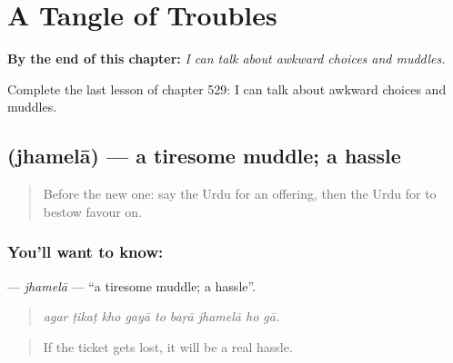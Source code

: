 
\chapter{A Tangle of Troubles}
\label{ch:ur-a-tangle-of-troubles}

\begin{chapteropening}
\textbf{By the end of this chapter:} \emph{I can talk about awkward choices and muddles.}

Complete the last lesson of chapter 529: I can talk about awkward choices and muddles.
\end{chapteropening}

\section[\texorpdfstring{\ur{جھمیلا} (jhamelā)}{جھمیلا (jhamelā)}]{ (jhamelā) — a tiresome muddle; a hassle}

\label{lesson:UR-C529-jhamela}



\begin{quote}
Before the new one: say the Urdu for an offering, then the Urdu for to bestow favour on.
\end{quote}

\subsection*{You'll want to know: }
\textbf{} — \emph{jhamelā} — \textquotedblleft{}a tiresome muddle; a hassle\textquotedblright{}.

\begin{quote}
        
\end{quote}

\begin{quote}
\emph{agar ṭikaṭ kho gayā to baṛā jhamelā ho gā.}
\end{quote}

\begin{quote}
If the ticket gets lost, it will be a real hassle.
\end{quote}

